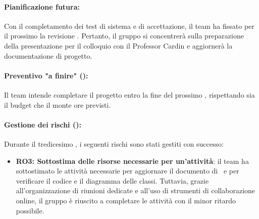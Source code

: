 \paragraph*{Pianificazione futura:}
\par Con il completamento dei test di sistema e di accettazione, il team ha fissato per il prossimo  la revisione . Pertanto, il gruppo si concentrerà sulla preparazione della presentazione per il colloquio con il Professor Cardin e aggiornerà la documentazione di progetto.

\paragraph*{Preventivo "a finire" ():}
\par Il team intende completare il progetto entro la fine del prossimo , rispettando sia il budget che il monte ore previsti.

\paragraph*{Gestione dei rischi ():}
\par Durante il tredicesimo , i seguenti rischi sono stati gestiti con successo:
\begin{itemize}
  \item \textbf{RO3: Sottostima delle risorse necessarie per un'attività}: il team ha sottostimato le attività necessarie per aggiornare il documento di \ST\ e per verificare il codice e il diagramma delle classi. Tuttavia, grazie all'organizzazione di riunioni dedicate e all'uso di strumenti di collaborazione online, il gruppo è riuscito a completare le attività con il minor ritardo possibile.
\end{itemize}
